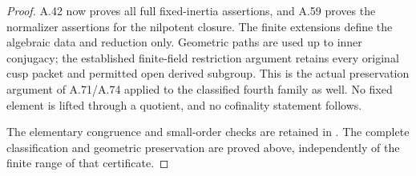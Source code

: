 \begin{proof}
A.42 now proves all full fixed-inertia assertions, and
A.59 proves the normalizer assertions for the nilpotent
closure. The finite extensions define the algebraic data
and reduction only. Geometric paths are used up to inner
conjugacy; the established finite-field restriction argument
retains every original cusp packet and permitted open
derived subgroup. This is the actual preservation argument
of A.71/A.74 applied to the classified fourth family as well.
No fixed element is lifted through a quotient, and no
cofinality statement follows.

The elementary congruence and small-order checks are retained
in . The complete
classification and geometric preservation are proved above,
independently of the finite range of that certificate.
\end{proof}
